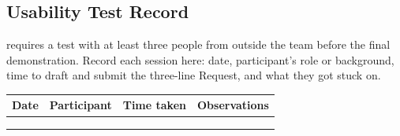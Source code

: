 \subsection*{Usability Test Record}

 requires a test with at least three people from outside the team before the final demonstration. Record each session here: date, participant's role or background, time to draft and submit the three-line Request, and what they got stuck on.

{\small
\begin{tabularx}{\textwidth}{@{}L{2.2cm}L{3.4cm}L{2.4cm}Y@{}}
\toprule
\textbf{Date} & \textbf{Participant} & \textbf{Time taken} & \textbf{Observations} \\
\midrule
 & & & \\[1.4em]\midrule
 & & & \\[1.4em]\midrule
 & & & \\[1.4em]
\bottomrule
\end{tabularx}
}
